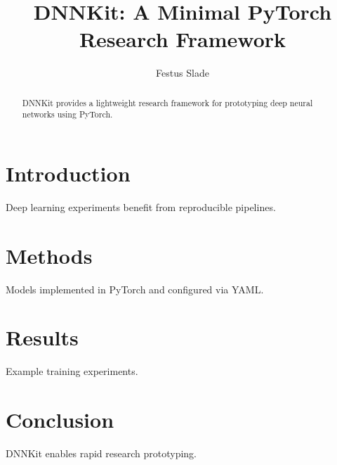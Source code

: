 \documentclass{article}
\title{DNNKit: A Minimal PyTorch Research Framework}
\author{Festus Slade}
\begin{document}
\maketitle

\begin{abstract}
DNNKit provides a lightweight research framework for prototyping deep neural networks using PyTorch.
\end{abstract}

\section{Introduction}
Deep learning experiments benefit from reproducible pipelines.

\section{Methods}
Models implemented in PyTorch and configured via YAML.

\section{Results}
Example training experiments.

\section{Conclusion}
DNNKit enables rapid research prototyping.
\end{document}
